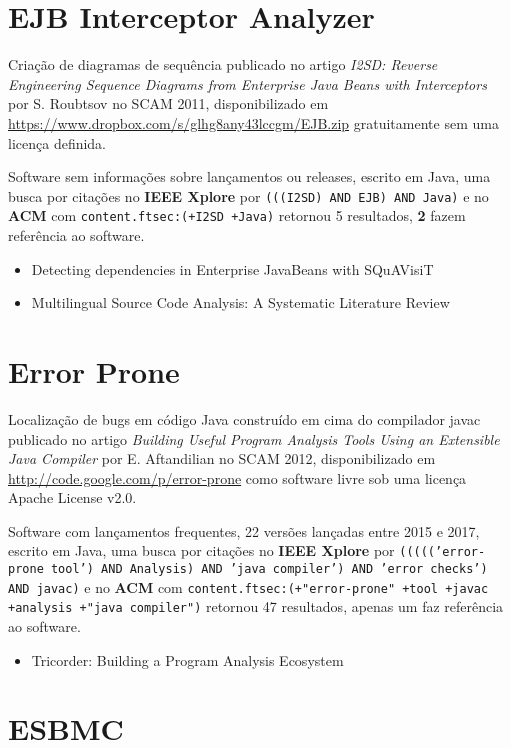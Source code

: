 \section{EJB Interceptor Analyzer}

Criação de diagramas de sequência
publicado no artigo {\it I2SD: Reverse Engineering Sequence Diagrams from Enterprise Java Beans with Interceptors}
por S. Roubtsov
no SCAM 2011,
disponibilizado em \url{https://www.dropbox.com/s/glhg8any43lccgm/EJB.zip}
gratuitamente
sem uma licença definida.

Software sem informações sobre lançamentos ou releases,
escrito em Java,
uma busca por citações no {\bf IEEE Xplore} por
\texttt{(((I2SD) AND EJB) AND Java)}
e no {\bf ACM} com
\texttt{content.ftsec:(+I2SD +Java)}
retornou
5 resultados,
{\bf 2} fazem referência ao software.

\begin{itemize}
\item Detecting dependencies in Enterprise JavaBeans with SQuAVisiT
\item Multilingual Source Code Analysis: A Systematic Literature Review
\end{itemize}

\section{Error Prone}

Localização de bugs em código Java construído em cima do compilador javac
publicado no artigo {\it Building Useful Program Analysis Tools Using an Extensible Java Compiler}
por E. Aftandilian
no SCAM 2012,
disponibilizado em \url{http://code.google.com/p/error-prone}
como software livre
sob uma licença Apache License v2.0.

Software com lançamentos frequentes,
22 versões lançadas
entre 2015 e 2017,
escrito em Java,
uma busca por citações no {\bf IEEE Xplore} por
\texttt{((((('error-prone tool') AND Analysis) AND 'java compiler') AND 'error checks') AND javac)}
e no {\bf ACM} com
\texttt{content.ftsec:(+"error-prone" +tool +javac +analysis +"java compiler")}
retornou
47 resultados,
apenas um faz referência ao software.

\begin{itemize}
\item Tricorder: Building a Program Analysis Ecosystem
\end{itemize}

\section{ESBMC}

